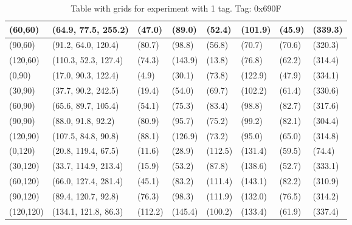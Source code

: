 \begin{table}[H]
\begin{tabular}{|l|l|l|l|l|l|l|l|}
        (60,60)     & (64.9, 77.5, 255.2)   & (47.0)  & (89.0)  & (52.4)  & (101.9) & (45.9)  & (339.3) \\ \hline
        (90,60)     & (91.2, 64.0, 120.4)   & (80.7)  & (98.8)  & (56.8)  & (70.7)  & (70.6)  & (320.3) \\ \hline
        (120,60)    & (110.3, 52.3, 127.4)  & (74.3)  & (143.9) & (13.8)  & (76.8)  & (62.2)  & (314.4) \\ \hline
        (0,90)      & (17.0, 90.3, 122.4)   & (4.9)   & (30.1)  & (73.8)  & (122.9) & (47.9)  & (334.1) \\ \hline
        (30,90)     & (37.7, 90.2, 242.5)   & (19.4)  & (54.0)  & (69.7)  & (102.2) & (61.4)  & (330.6) \\ \hline
        (60,90)     & (65.6, 89.7, 105.4)   & (54.1)  & (75.3)  & (83.4)  & (98.8)  & (82.7)  & (317.6) \\ \hline
        (90,90)     & (88.0, 91.8, 92.2)    & (80.9)  & (95.7)  & (75.2)  & (99.2)  & (82.1)  & (304.4) \\ \hline
        (120,90)    & (107.5, 84.8, 90.8)   & (88.1)  & (126.9) & (73.2)  & (95.0)  & (65.0)  & (314.8) \\ \hline
        (0,120)     & (20.8, 119.4, 67.5)   & (11.6)  & (28.9)  & (112.5) & (131.4) & (59.5)  & (74.4)  \\ \hline
        (30,120)    & (33.7, 114.9, 213.4)  & (15.9)  & (53.2)  & (87.8)  & (138.6) & (52.7)  & (333.1) \\ \hline
        (60,120)    & (66.0, 127.4, 281.4)  & (45.1)  & (83.2)  & (111.4) & (143.1) & (82.2)  & (310.9) \\ \hline
        (90,120)    & (89.4, 120.7, 92.8)   & (76.3)  & (98.3)  & (111.9) & (132.0) & (76.5)  & (314.2) \\ \hline
        (120,120)   & (134.1, 121.8, 86.3)  & (112.2) & (145.4) & (100.2) & (133.4) & (61.9)  & (337.4) \\ \hline
    \end{tabular}
    \label{Tab:one-tag-experiment-result}
    \caption{Table with grids for experiment with 1 tag. Tag: 0x690F}
\end{table}

